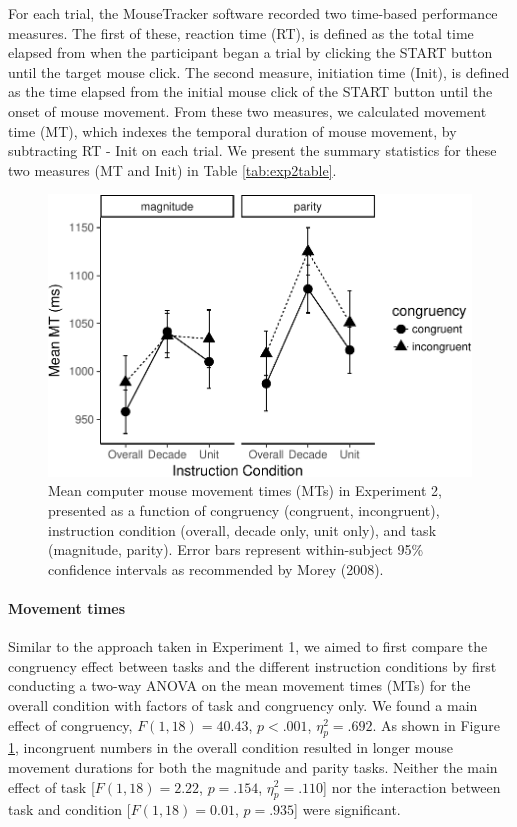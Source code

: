 \documentclass[english,man]{apa6}
\theoremstyle{definition}
\theoremstyle{definition}
\theoremstyle{definition}
\theoremstyle{remark}
\begin{document}
For each trial, the MouseTracker software recorded two time-based
performance measures. The first of these, reaction time (RT), is defined
as the total time elapsed from when the participant began a trial by
clicking the START button until the target mouse click. The second
measure, initiation time (Init), is defined as the time elapsed from the
initial mouse click of the START button until the onset of mouse
movement. From these two measures, we calculated movement time (MT),
which indexes the temporal duration of mouse movement, by subtracting RT
- Init on each trial. We present the summary statistics for these two
measures (MT and Init) in Table \ref{tab:exp2table}.

\begin{figure}
\centering
\includegraphics{paper_files/figure-latex/exp2-mt-1.pdf}
\caption{\label{fig:exp2-mt}Mean computer mouse movement times (MTs) in
Experiment 2, presented as a function of congruency (congruent,
incongruent), instruction condition (overall, decade only, unit only),
and task (magnitude, parity). Error bars represent within-subject 95\%
confidence intervals as recommended by Morey (2008).}
\end{figure}

\paragraph{Movement times}\label{movement-times}

Similar to the approach taken in Experiment 1, we aimed to first compare
the congruency effect between tasks and the different instruction
conditions by first conducting a two-way ANOVA on the mean movement
times (MTs) for the overall condition with factors of task and
congruency only. We found a main effect of congruency,
\(F(1, 18) = 40.43\), \(p < .001\), \(\eta^2_p = .692\). As shown in
Figure \ref{fig:exp2-mt}, incongruent numbers in the overall condition
resulted in longer mouse movement durations for both the magnitude and
parity tasks. Neither the main effect of task {[}\(F(1, 18) = 2.22\),
\(p = .154\), \(\eta^2_p = .110\){]} nor the interaction between task
and condition {[}\(F(1, 18) = 0.01\), \(p = .935\){]} were significant.
\end{document}

